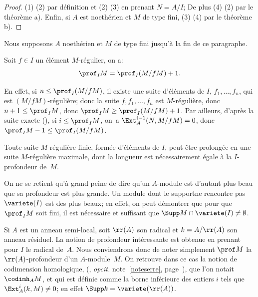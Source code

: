\skpt
\begin{proof}
(1) \SSI (2) par d\'efinition et (2) \ALORS (3) en prenant $N=A/I$; De plus (4) \ALORS (2) par le th\'eor\`eme  a). Enfin, si $A$ est noeth\'erien et $M$ de type fini, (3) \ALORS (4) par le th\'eor\`eme  b).
\skipqed
\end{proof}

Nous supposons $A$ noeth\'erien et $M$ de type fini jusqu'\`a la fin de ce paragraphe.

\begin{corollaire} \label{III.2.5}
Soit $f\in I$ un \'el\'ement $M$-r\'egulier, on a:
\[
\prof_I M = \prof_I (M/fM) + 1.
\]
\end{corollaire}

En effet, si $n\leq \prof_I (M/fM)$, il existe une suite d'\'el\'ements de $I$, $f_1, \ldots, f_n$, qui est $(M/fM)$-r\'eguli\`ere; donc la suite $f, f_1, \ldots, f_n$ est $M$-r\'eguli\`ere, donc $n+1 \leq \prof_I M$, donc $\prof_I M\geq \prof_I (M/fM) + 1$. Par ailleurs, d'apr\`es la suite exacte (), si $i \leq \prof_I M$, on~a $\Ext_A^{i-1} (N, M/fM)=0$, donc $\prof_I M - 1 \leq \prof_I (M/fM)$.

\enlargethispage{1.2\baselineskip}%
\begin{corollaire} \label{III.2.6}
Toute suite $M$-r\'eguli\`ere finie, form\'ee d'\'el\'ements de $I$, peut \^etre prolong\'ee en une suite $M$-r\'eguli\`ere maximale, dont la longueur est n\'ecessairement \'egale \`a la $I$-profondeur de~$M$.
\end{corollaire}

\begin{remarque} \label{III.2.7}
On ne se retient qu'\`a grand peine de dire qu'un $A$-module est d'autant plus beau que sa profondeur est plus grande. Un module dont le support\pageoriginale ne rencontre pas $\variete (I)$ est des plus beaux; en effet, on peut d\'emontrer que pour que $\prof_I M$ soit fini, il est n\'ecessaire et suffisant que $\Supp M \cap \variete(I) \neq \emptyset$.
\end{remarque}

\begin{remarque} \label{III.2.8}
Si $A$ est un anneau semi-local, soit $\rr(A)$ son radical et $k=A/\rr(A)$ son anneau r\'esiduel. La notion de profondeur int\'eressante est obtenue en prenant pour $I$ le radical de~$A$. Nous conviendrons donc de noter simplement $\prof M$ la $\rr(A)$-profondeur d'un $A$-module~$M$. On retrouve dans ce cas la notion de \og codimension homologique\fg, (\cf {}, \textit{op\ptbl cit.} note~\eqref{noteserre}, page~\pageref{noteserre}), que l'on notait $\codimh_A M$, et qui est d\'efinie comme la borne inf\'erieure des entiers $i$ tels que $\Ext_A^i(k, M)\neq 0$; en effet $\Supp k = \variete(\rr(A))$.
\end{remarque}

